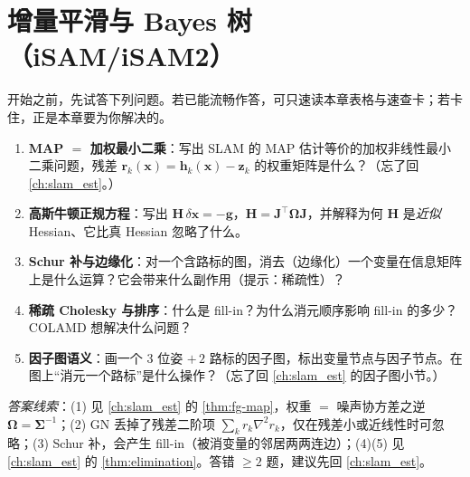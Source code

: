 \chapter{增量平滑与 Bayes 树（iSAM/iSAM2）}
\label{ch:isam2}


\begin{practice}[前置自测]
开始之前，先试答下列问题。若已能流畅作答，可只速读本章表格与速查卡；若卡住，正是本章要为你解决的。
\begin{enumerate}
  \item \textbf{MAP $=$ 加权最小二乘}：写出 SLAM 的 MAP 估计等价的加权非线性最小二乘问题，残差 $\mathbf{r}_k(\mathbf{x})=\mathbf{h}_k(\mathbf{x})-\mathbf{z}_k$ 的权重矩阵是什么？（忘了回 \cref{ch:slam_est}。）
  \item \textbf{高斯牛顿正规方程}：写出 $\mathbf{H}\,\delta\mathbf{x}=-\mathbf{g}$，$\mathbf{H}=\mathbf{J}^\top\boldsymbol{\Omega}\mathbf{J}$，并解释为何 $\mathbf{H}$ 是\emph{近似} Hessian、它比真 Hessian 忽略了什么。
  \item \textbf{Schur 补与边缘化}：对一个含路标的图，消去（边缘化）一个变量在信息矩阵上是什么运算？它会带来什么副作用（提示：稀疏性）？
  \item \textbf{稀疏 Cholesky 与排序}：什么是 fill-in？为什么消元顺序影响 fill-in 的多少？COLAMD 想解决什么问题？
  \item \textbf{因子图语义}：画一个 $3$ 位姿 $+\,2$ 路标的因子图，标出变量节点与因子节点。在图上“消元一个路标”是什么操作？（忘了回 \cref{ch:slam_est} 的因子图小节。）
\end{enumerate}
\noindent\emph{答案线索}：(1) 见 \cref{ch:slam_est} 的 \cref{thm:fg-map}，权重 $=$ 噪声协方差之逆 $\boldsymbol{\Omega}=\boldsymbol{\Sigma}^{-1}$；(2) GN 丢掉了残差二阶项 $\sum_k r_k\nabla^2 r_k$，仅在残差小或近线性时可忽略；(3) Schur 补，会产生 fill-in（被消变量的邻居两两连边）；(4)(5) 见 \cref{ch:slam_est} 的 \cref{thm:elimination}。答错 $\ge 2$ 题，建议先回 \cref{ch:slam_est}。
\end{practice}

